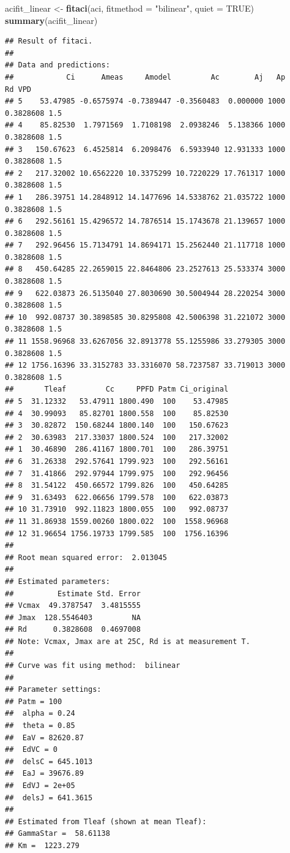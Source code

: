 \documentclass[
]{krantz}
\makeatletter
\newenvironment{Shaded}{\begin{snugshade}}{\end{snugshade}}
\newcommand{\DataTypeTok}[1]{\textcolor[rgb]{0.13,0.29,0.53}{#1}}
\newcommand{\KeywordTok}[1]{\textcolor[rgb]{0.13,0.29,0.53}{\textbf{#1}}}
\newcommand{\NormalTok}[1]{#1}
\newcommand{\OtherTok}[1]{\textcolor[rgb]{0.56,0.35,0.01}{#1}}
\newcommand{\StringTok}[1]{\textcolor[rgb]{0.31,0.60,0.02}{#1}}
\newenvironment{kframe}{%
\medskip{}
\setlength{\fboxsep}{.8em}
 \def\at@end@of@kframe{}%
 \ifinner\ifhmode%
  \def\at@end@of@kframe{\end{minipage}}%
  \begin{minipage}{\columnwidth}%
 \fi\fi%
 \def\FrameCommand##1{\hskip\@totalleftmargin \hskip-\fboxsep
 \colorbox{shadecolor}{##1}\hskip-\fboxsep
     \hskip-\linewidth \hskip-\@totalleftmargin \hskip\columnwidth}%
 \MakeFramed {\advance\hsize-\width
   \@totalleftmargin\z@ \linewidth\hsize
   \@setminipage}}%
 {\par\unskip\endMakeFramed%
 \at@end@of@kframe}
\renewenvironment{Shaded}{\begin{kframe}}{\end{kframe}}
\makeatother
\begin{document}
\begin{Shaded}
\begin{Highlighting}[]
\NormalTok{acifit\_linear \textless{}{-}}\StringTok{ }\KeywordTok{fitaci}\NormalTok{(aci,  }\DataTypeTok{fitmethod =} \StringTok{"bilinear"}\NormalTok{, }\DataTypeTok{quiet =} \OtherTok{TRUE}\NormalTok{)}
\KeywordTok{summary}\NormalTok{(acifit\_linear)}
\end{Highlighting}
\end{Shaded}

\begin{verbatim}
## Result of fitaci.
## 
## Data and predictions:
##            Ci      Ameas     Amodel         Ac        Aj   Ap        Rd VPD
## 5    53.47985 -0.6575974 -0.7389447 -0.3560483  0.000000 1000 0.3828608 1.5
## 4    85.82530  1.7971569  1.7108198  2.0938246  5.138366 1000 0.3828608 1.5
## 3   150.67623  6.4525814  6.2098476  6.5933940 12.931333 1000 0.3828608 1.5
## 2   217.32002 10.6562220 10.3375299 10.7220229 17.761317 1000 0.3828608 1.5
## 1   286.39751 14.2848912 14.1477696 14.5338762 21.035722 1000 0.3828608 1.5
## 6   292.56161 15.4296572 14.7876514 15.1743678 21.139657 1000 0.3828608 1.5
## 7   292.96456 15.7134791 14.8694171 15.2562440 21.117718 1000 0.3828608 1.5
## 8   450.64285 22.2659015 22.8464806 23.2527613 25.533374 3000 0.3828608 1.5
## 9   622.03873 26.5135040 27.8030690 30.5004944 28.220254 3000 0.3828608 1.5
## 10  992.08737 30.3898585 30.8295808 42.5006398 31.221072 3000 0.3828608 1.5
## 11 1558.96968 33.6267056 32.8913778 55.1255986 33.279305 3000 0.3828608 1.5
## 12 1756.16396 33.3152783 33.3316070 58.7237587 33.719013 3000 0.3828608 1.5
##       Tleaf         Cc     PPFD Patm Ci_original
## 5  31.12332   53.47911 1800.490  100    53.47985
## 4  30.99093   85.82701 1800.558  100    85.82530
## 3  30.82872  150.68244 1800.140  100   150.67623
## 2  30.63983  217.33037 1800.524  100   217.32002
## 1  30.46890  286.41167 1800.701  100   286.39751
## 6  31.26338  292.57641 1799.923  100   292.56161
## 7  31.41866  292.97944 1799.975  100   292.96456
## 8  31.54122  450.66572 1799.826  100   450.64285
## 9  31.63493  622.06656 1799.578  100   622.03873
## 10 31.73910  992.11823 1800.055  100   992.08737
## 11 31.86938 1559.00260 1800.022  100  1558.96968
## 12 31.96654 1756.19733 1799.585  100  1756.16396
## 
## Root mean squared error:  2.013045 
## 
## Estimated parameters:
##          Estimate Std. Error
## Vcmax  49.3787547  3.4815555
## Jmax  128.5546403         NA
## Rd      0.3828608  0.4697008
## Note: Vcmax, Jmax are at 25C, Rd is at measurement T.
## 
## Curve was fit using method:  bilinear 
## 
## Parameter settings:
## Patm = 100
##  alpha = 0.24
##  theta = 0.85
##  EaV = 82620.87
##  EdVC = 0
##  delsC = 645.1013
##  EaJ = 39676.89
##  EdVJ = 2e+05
##  delsJ = 641.3615
## 
## Estimated from Tleaf (shown at mean Tleaf):
## GammaStar =  58.61138 
## Km =  1223.279
\end{verbatim}
\end{document}
